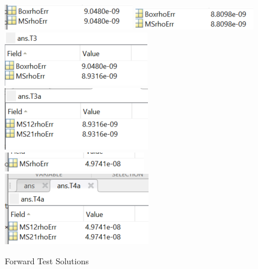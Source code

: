 \documentclass[11pt, a4paper]{article}
\theoremstyle{definition}
\begin{document}
	\begin{figure}[h]
		\centering
		\includegraphics[scale=1]{T1.png}
		\includegraphics[scale=1]{T2.png}
		\includegraphics[scale=1]{T3.png}\\
		\includegraphics[scale=1]{T3a.png}
		\includegraphics[scale=1]{T4.png}
		\includegraphics[scale=1]{T4a.png}
		\caption{Forward Test Solutions} 
		\label{F0a}
    \end{figure}
\end{document}
